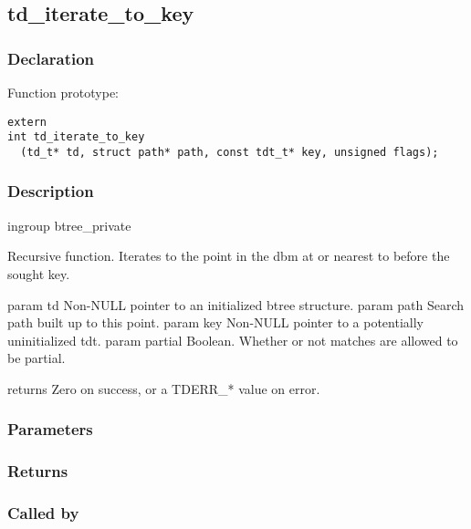 
\newpage
\subsection{td\_iterate\_to\_key}
\subsubsection{Declaration} Function prototype:

\begin{verbatim}
extern
int td_iterate_to_key
  (td_t* td, struct path* path, const tdt_t* key, unsigned flags);
\end{verbatim}

\subsubsection{Description}


 ingroup btree\_private

 Recursive function.
 Iterates to the point in the dbm at or nearest to before the sought key.

 param td Non-NULL pointer to an initialized btree structure.
 param path Search path built up to this point.
 param key Non-NULL pointer to a potentially uninitialized tdt.
 param partial Boolean. Whether or not matches are allowed to be partial.

 returns Zero on success, or a TDERR\_* value on error.
 

\subsubsection{Parameters}
\subsubsection{Returns}
\subsubsection{Called by}
